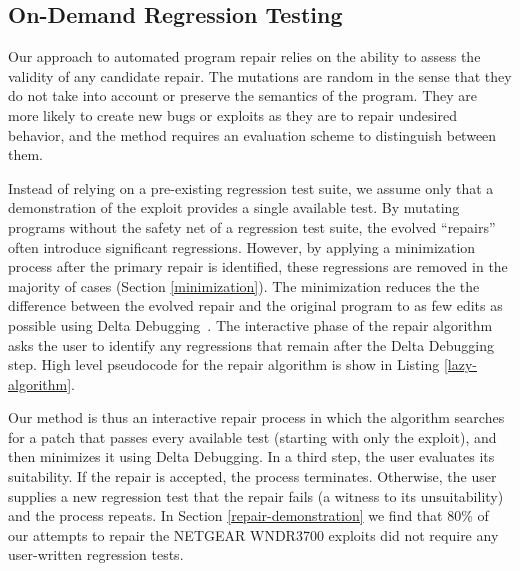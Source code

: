 \documentclass{sigcomm-alternate}
\begin{document}
{\subsection{On-Demand Regression Testing}
\label{on-demand-regression}

Our approach to automated program repair relies on the ability to
assess the validity of any candidate repair.  The mutations are random
in the sense that they do not take into account or preserve the
semantics of the program.  They are more likely to create new bugs
or exploits as they are to repair undesired behavior, and the method
requires an evaluation scheme to distinguish between them.

Instead of relying on a pre-existing regression test suite, we assume
only that a demonstration of the exploit provides a single available
test.  By mutating programs without the safety net of a regression
test suite, the evolved ``repairs'' often introduce significant
regressions.  However, by applying a minimization process after the
primary repair is identified, these regressions are removed in the
majority of cases (Section \ref{minimization}).  The minimization
reduces the the difference between the evolved repair and the original
program to as few edits as possible using Delta
Debugging~\cite{delta}.  The interactive phase of the repair algorithm
asks the user to identify any regressions that remain after the Delta
Debugging step.  High level pseudocode for the repair algorithm is
show in Listing \ref{lazy-algorithm}.

Our method is thus an interactive repair process in which the
algorithm searches for a patch that 
passes every available test (starting with only the exploit), and then
minimizes it using Delta Debugging.  In a third step,
the user evaluates its suitability.  If the repair is accepted, the process
terminates. Otherwise, the user supplies a new regression test that the repair
fails (a witness to its unsuitability) and the process repeats. 
In Section \ref{repair-demonstration} we find that 80\% of our
attempts to repair the NETGEAR WNDR3700 exploits did not require any
user-written regression tests.

}
\end{document}
